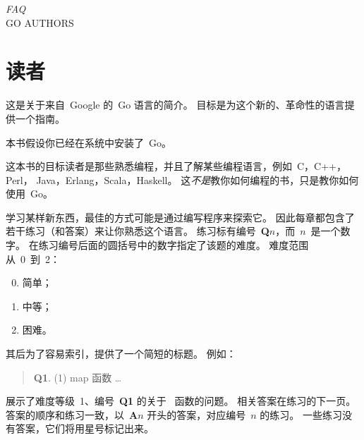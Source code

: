 {\textit{FAQ}\\ \textsc{GO AUTHORS}}

\section{读者}
\noindent{}这是关于来自~Google 的~Go 语言的简介。
目标是为这个新的、革命性的语言提供一个指南。

本书假设你已经在系统中安装了~Go。

这本书的目标读者是那些熟悉编程，并且了解某些编程语言，例如~C\cite{c}，C++\cite{c++}，\\ 
Perl\cite{perl}， Java\cite{java}，Erlang\cite{erlang}，Scala\cite{scala}，Haskell\cite{haskell}。
这\emph{不是}教你如何编程的书，只是教你如何使用~Go。

学习某样新东西，最佳的方式可能是通过编写程序来探索它。
因此每章都包含了若干练习（和答案）来让你熟悉这个语言。
练习标有编号~\textbf{Q$n$}，而~$n$~是一个数字。 
在练习编号后面的圆括号中的数字指定了该题的难度。
难度范围从~0~到~2：
\begin{enumerate}
\setcounter{enumi}{-1}
\item 简单；
\item 中等；
\item 困难。
\end{enumerate}

其后为了容易索引，提供了一个简短的标题。
例如：
\begin{verse}
\textbf{Q1}. (1) map 函数 \ldots
\end{verse}
展示了难度等级~1、编号~\textbf{Q1} 的关于~ 函数的问题。
相关答案在练习的下一页。
答案的顺序和练习一致，以~\textbf{A$n$} 开头的答案，对应编号~$n$ 的练习。
一些练习没有答案，它们将用星号标记出来。

